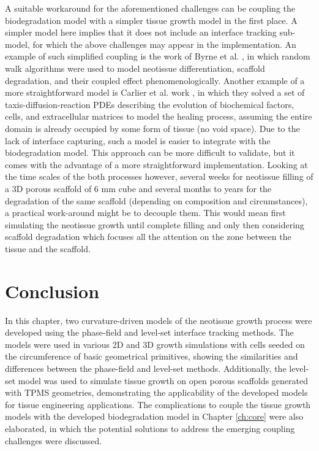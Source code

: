 A suitable workaround for the aforementioned challenges can be coupling the biodegradation model with a simpler tissue growth model in the first place. A simpler model here implies that it does not include an interface tracking sub-model, for which the above challenges may appear in the implementation. An example of such simplified coupling is the work of Byrne et al. \cite{Byrne2007}, in which random walk algorithms were used to model neotissue differentiation, scaffold degradation, and their coupled effect phenomenologically. Another example of a more straightforward model is Carlier et al. work \cite{Carlier2012,Carlier2016}, in which they solved a set of taxis-diffusion-reaction \gls{PDE}s describing the evolution of biochemical factors, cells, and extracellular matrices to model the healing process, assuming the entire domain is already occupied by some form of tissue (no void space). Due to the lack of interface capturing, such a model is easier to integrate with the biodegradation model. This approach can be more difficult to validate, but it comes with the advantage of a more straightforward implementation. Looking at the time scales of the both processes however, several weeks for neotissue filling of a 3D porous scaffold of 6 mm cube and several months to years for the degradation of the same scaffold (depending on composition and circumstances), a practical work-around might be to decouple them. This would mean first simulating the neotissue growth until complete filling and only then considering scaffold degradation which focuses all the attention on the zone between the tissue and the scaffold.

\section{Conclusion}

In this chapter, two curvature-driven models of the neotissue growth process were developed using the phase-field and level-set interface tracking methods. The models were used in various 2D and 3D growth simulations with cells seeded on the circumference of basic geometrical primitives, showing the similarities and differences between the phase-field and level-set methods. Additionally, the level-set model was used to simulate tissue growth on open porous scaffolds generated with \gls{TPMS} geometries, demonstrating the applicability of the developed models for tissue engineering applications. The complications to couple the tissue growth models with the developed biodegradation model in Chapter \ref{ch:core} were also elaborated, in which the potential solutions to address the emerging coupling challenges were discussed.


